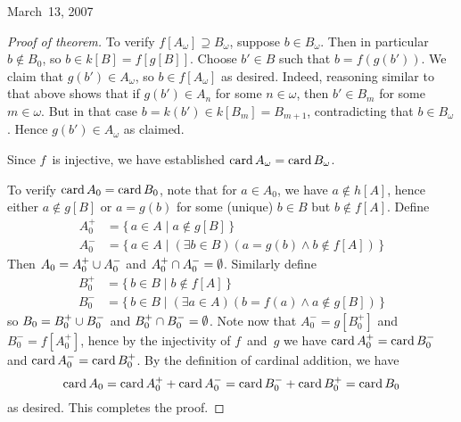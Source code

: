 \begin{lecture}{March~13, 2007}
\begin{proof}[Proof of theorem]
To verify \(f[A_{\omega}]\supseteq B_{\omega}\), suppose \(b\in B_{\omega}\). Then in particular \(b\not\in B_0\), so \(b\in k[B]=f[g[B]]\). Choose \(b'\in B\) such that \(b=f(g(b'))\). We claim that \(g(b')\in A_{\omega}\), so \(b\in f[A_{\omega}]\) as desired. Indeed, reasoning similar to that above shows that if \(g(b')\in A_n\) for some \(n\in\omega\), then \(b'\in B_m\) for some \(m\in\omega\). But in that case \(b=k(b')\in k[B_m]=B_{m+1}\), contradicting that \(b\in B_{\omega}\). Hence \(g(b')\in A_{\omega}\) as claimed.

Since \(f\)~is injective, we have established \(\operatorname{card} A_{\omega}=\operatorname{card} B_{\omega}\).

To verify \(\operatorname{card} A_0=\operatorname{card} B_0\), note that for \(a\in A_0\), we have \(a\not\in h[A]\), hence either \(a\not\in g[B]\) or \(a=g(b)\) for some (unique) \(b\in B\) but \(b\not\in f[A]\). Define
\begin{align*}
A_0^+&=\{\,a\in A\mid a\not\in g[B]\,\}\\
A_0^-&=\{\,a\in A\mid (\exists b\in B)(a=g(b)\land b\not\in f[A])\,\}
\end{align*}
Then \(A_0=A_0^+\cup A_0^-\) and \(A_0^+\cap A_0^-=\emptyset\). Similarly define
\begin{align*}
B_0^+&=\{\,b\in B\mid b\not\in f[A]\,\}\\
B_0^-&=\{\,b\in B\mid (\exists a\in A)(b=f(a)\land a\not\in g[B])\,\}
\end{align*}
so \(B_0=B_0^+\cup B_0^-\) and \(B_0^+\cap B_0^-=\emptyset\). Note now that \(A_0^-=g[B_0^+]\) and \(B_0^-=f[A_0^+]\), hence by the injectivity of \(f\)~and~\(g\) we have \(\operatorname{card} A_0^+=\operatorname{card} B_0^-\) and \(\operatorname{card} A_0^-=\operatorname{card} B_0^+\). By the definition of cardinal addition, we have
\[\operatorname{card} A_0=\operatorname{card} A_0^+ +\operatorname{card} A_0^-=\operatorname{card} B_0^- +\operatorname{card} B_0^+=\operatorname{card} B_0\]
as desired. This completes the proof.
\end{proof}
\end{lecture}
